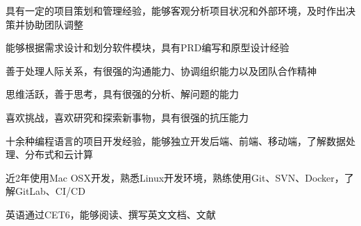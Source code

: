 


\begin{cventries}


\ljycventry
{
\begin{cvitems}
\item {具有一定的项目策划和管理经验，能够客观分析项目状况和外部环境，及时作出决策并协助团队调整}
\item {能够根据需求设计和划分软件模块，具有PRD编写和原型设计经验}
\item{善于处理人际关系，有很强的沟通能力、协调组织能力以及团队合作精神}
\item{思维活跃，善于思考，具有很强的分析、解问题的能力}
\item{喜欢挑战，喜欢研究和探索新事物，具有很强的抗压能力}
\item {十余种编程语言的项目开发经验，能够独立开发后端、前端、移动端，了解数据处理、分布式和云计算}
\item{近2年使用Mac OSX开发，熟悉Linux开发环境，熟练使用Git、SVN、Docker，了解GitLab、CI/CD}
\item{英语通过CET6，能够阅读、撰写英文文档、文献}
\end{cvitems}
}

\end{cventries}

